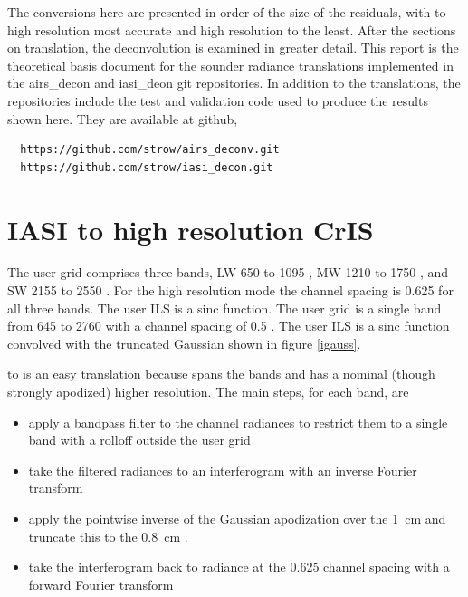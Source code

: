 \documentclass[12pt]{article}
\begin{document}
The conversions here are presented in order of the size of the
residuals, with {\iasi} to high resolution {\cris} most accurate and
high resolution {\cris} to {\airs} the least.  After the sections on
translation, the {\airs} deconvolution is examined in greater
detail.  This report is the theoretical basis document for the
sounder radiance translations implemented in the airs\_decon and
iasi\_deon git repositories.  In addition to the translations, the
repositories include the test and validation code used to produce
the results shown here.  They are available at github,
\begin{verbatim}
  https://github.com/strow/airs_deconv.git
  https://github.com/strow/iasi_decon.git
\end{verbatim}


\section{IASI to high resolution CrIS}

The {\cris} user grid comprises three bands, LW 650 to 1095 {\wn},
MW 1210 to 1750 {\wn}, and SW 2155 to 2550 {\wn}.  For the {\cris}
high resolution mode the channel spacing is 0.625 {\wn} for all
three bands.  The {\cris} user ILS is a sinc function.  The {\iasi}
user grid is a single band from 645 to 2760 {\wn} with a channel
spacing of 0.5 {\wn}.  The {\iasi} user ILS is a sinc function
convolved with the truncated Gaussian shown in figure \ref{igauss}.

{\iasi} to {\cris} is an easy translation because {\iasi} spans the
{\cris} bands and has a nominal (though strongly apodized) higher
resolution.  The main steps, for each {\cris} band, are

\begin{itemize}

  \item apply a bandpass filter to the {\iasi} channel radiances to
    restrict them to a single {\cris} band with a rolloff outside the
    {\cris} user grid

  \item take the filtered radiances to an interferogram with an
    inverse Fourier transform

  \item apply the pointwise inverse of the {\iasi} Gaussian
    apodization over the {\iasi} 1~cm {\opd} and truncate this to
    the 0.8~cm {\cris} {\opd}.

  \item take the interferogram back to radiance at the {\cris}
    0.625 {\wn} channel spacing with a forward Fourier transform

\end{itemize}
\end{document}
